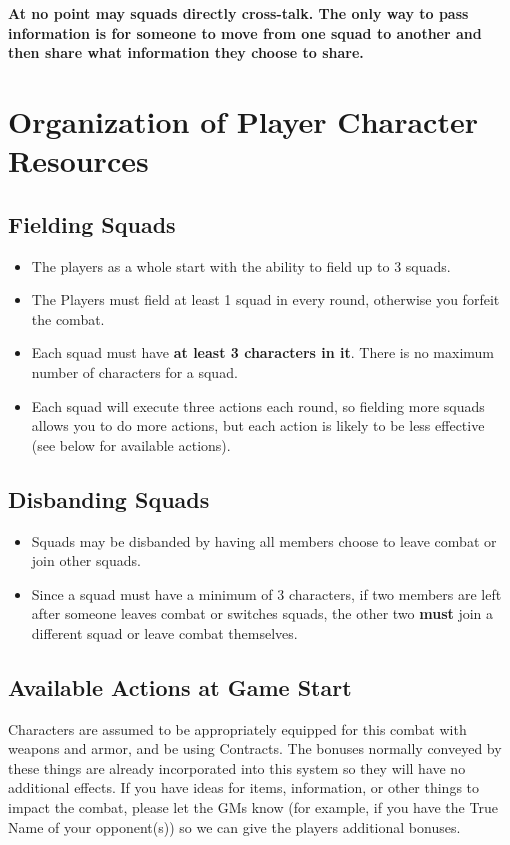 \documentclass[green]{gl2018}
\begin{document}
{\bf At no point may squads directly cross-talk. The only way to pass information is for someone to move from one squad to another and then share what information they choose to share.}

\section*{Organization of Player Character Resources}
\subsection*{Fielding Squads}
\begin{itemize}
	\item The players as a whole start with the ability to field up to 3 squads. 
	\item The Players must field at least 1 squad in every round, otherwise you forfeit the combat.
	\item Each squad must have {\bf at least 3 characters in it}. There is no maximum number of characters for a squad.
	\item Each squad will execute three actions each round, so fielding more squads allows you to do more actions, but each action is likely to be less effective (see below for available actions).
\end{itemize}

\subsection*{Disbanding Squads}
\begin{itemize}
	\item Squads may be disbanded by having all members choose to leave combat or join other squads.
	\item Since a squad must have a minimum of 3 characters, if two members are left after someone leaves combat or switches squads, the other two {\bf must} join a different squad or leave combat themselves.
\end{itemize}

\subsection*{Available Actions at Game Start}
Characters are assumed to be appropriately equipped for this combat with weapons and armor, and be using Contracts. The bonuses normally conveyed by these things are already incorporated into this system so they will have no additional effects. If you have ideas for items, information, or other things to impact the combat, please let the GMs know (for example, if you have the True Name of your opponent(s)) so we can give the players additional bonuses.
\end{document}
